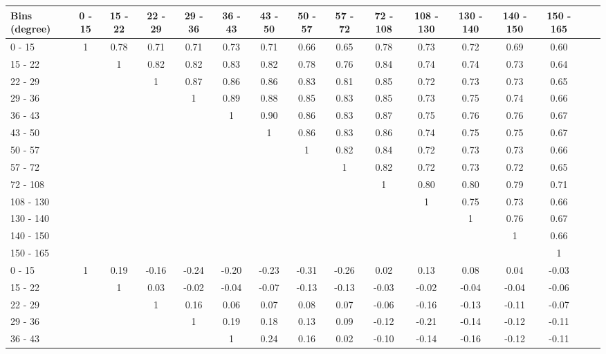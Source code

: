 \begingroup
\squeezetable
\begin{table}[ht]
\begin{tabular}{l|ccccccccccccccc}
\hline\hline
Bins (degree) & 0 - 15 & 15 - 22 & 22 - 29 & 29 - 36 & 36 - 43 & 43 - 50 & 50 - 57 & 57 - 72 & 72 - 108 & 108 - 130 & 130 - 140 & 140 - 150 & 150 - 165 \\ 
\hline
0 - 15 & 1 & 0.78 & 0.71 & 0.71 & 0.73 & 0.71 & 0.66 & 0.65 & 0.78 & 0.73 & 0.72 & 0.69 & 0.60 \\ 
15 - 22 &  & 1 & 0.82 & 0.82 & 0.83 & 0.82 & 0.78 & 0.76 & 0.84 & 0.74 & 0.74 & 0.73 & 0.64 \\ 
22 - 29 &  &  & 1 & 0.87 & 0.86 & 0.86 & 0.83 & 0.81 & 0.85 & 0.72 & 0.73 & 0.73 & 0.65 \\ 
29 - 36 &  &  &  & 1 & 0.89 & 0.88 & 0.85 & 0.83 & 0.85 & 0.73 & 0.75 & 0.74 & 0.66 \\ 
36 - 43 &  &  &  &  & 1 & 0.90 & 0.86 & 0.83 & 0.87 & 0.75 & 0.76 & 0.76 & 0.67 \\ 
43 - 50 &  &  &  &  &  & 1 & 0.86 & 0.83 & 0.86 & 0.74 & 0.75 & 0.75 & 0.67 \\ 
50 - 57 &  &  &  &  &  &  & 1 & 0.82 & 0.84 & 0.72 & 0.73 & 0.73 & 0.66 \\ 
57 - 72 &  &  &  &  &  &  &  & 1 & 0.82 & 0.72 & 0.73 & 0.72 & 0.65 \\ 
72 - 108 &  &  &  &  &  &  &  &  & 1 & 0.80 & 0.80 & 0.79 & 0.71 \\ 
108 - 130 &  &  &  &  &  &  &  &  &  & 1 & 0.75 & 0.73 & 0.66 \\ 
130 - 140 &  &  &  &  &  &  &  &  &  &  & 1 & 0.76 & 0.67 \\ 
140 - 150 &  &  &  &  &  &  &  &  &  &  &  & 1 & 0.66 \\ 
150 - 165 &  &  &  &  &  &  &  &  &  &  &  &  & 1 \\ 
\hline
0 - 15 & 1 & 0.19 & -0.16 & -0.24 & -0.20 & -0.23 & -0.31 & -0.26 & 0.02 & 0.13 & 0.08 & 0.04 & -0.03 \\ 
15 - 22 &  & 1 & 0.03 & -0.02 & -0.04 & -0.07 & -0.13 & -0.13 & -0.03 & -0.02 & -0.04 & -0.04 & -0.06 \\ 
22 - 29 &  &  & 1 & 0.16 & 0.06 & 0.07 & 0.08 & 0.07 & -0.06 & -0.16 & -0.13 & -0.11 & -0.07 \\ 
29 - 36 &  &  &  & 1 & 0.19 & 0.18 & 0.13 & 0.09 & -0.12 & -0.21 & -0.14 & -0.12 & -0.11 \\ 
36 - 43 &  &  &  &  & 1 & 0.24 & 0.16 & 0.02 & -0.10 & -0.14 & -0.16 & -0.12 & -0.11 \\ 

\end{tabular}
\end{table}
